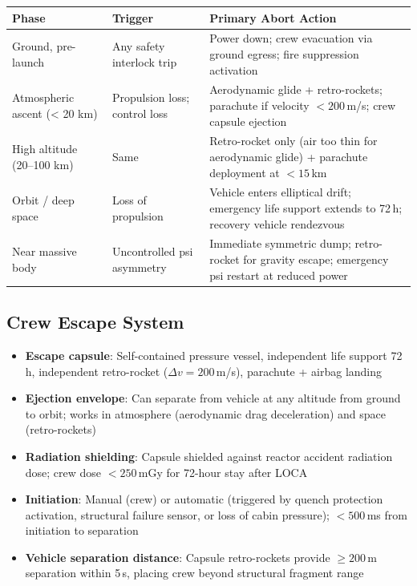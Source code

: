\documentclass[11pt,a4paper]{article}
\begin{document}
\begin{longtable}{p{0.20\tw}p{0.25\tw}p{0.45\tw}}
\toprule
\textbf{Phase} & \textbf{Trigger} & \textbf{Primary Abort Action} \\
\midrule
\endhead
Ground, pre-launch & Any safety interlock trip & Power down; crew evacuation
  via ground egress; fire suppression activation \\
Atmospheric ascent (< 20 km) & Propulsion loss; control loss & Aerodynamic
  glide + retro-rockets; parachute if velocity $< 200$\,m/s; crew capsule
  ejection \\
High altitude (20--100 km) & Same & Retro-rocket only (air too thin for
  aerodynamic glide) + parachute deployment at $< 15$\,km \\
Orbit / deep space & Loss of propulsion & Vehicle enters elliptical drift;
  emergency life support extends to 72\,h; recovery vehicle rendezvous \\
Near massive body & Uncontrolled psi asymmetry & Immediate symmetric dump;
  retro-rocket for gravity escape; emergency psi restart at reduced power \\
\bottomrule
\end{longtable}

\subsection{Crew Escape System}

\begin{itemize}
  \item \textbf{Escape capsule}: Self-contained pressure vessel,
    independent life support 72\,h, independent retro-rocket
    ($\Delta v = 200$\,m/s), parachute + airbag landing
  \item \textbf{Ejection envelope}: Can separate from vehicle at
    any altitude from ground to orbit; works in atmosphere (aerodynamic
    drag deceleration) and space (retro-rockets)
  \item \textbf{Radiation shielding}: Capsule shielded against reactor
    accident radiation dose; crew dose $< 250$\,mGy for 72-hour stay
    after LOCA
  \item \textbf{Initiation}: Manual (crew) or automatic (triggered by
    quench protection activation, structural failure sensor, or
    loss of cabin pressure); $< 500$\,ms from initiation to separation
  \item \textbf{Vehicle separation distance}: Capsule retro-rockets
    provide $\geq 200$\,m separation within 5\,s, placing crew
    beyond structural fragment range
\end{itemize}
\end{document}
